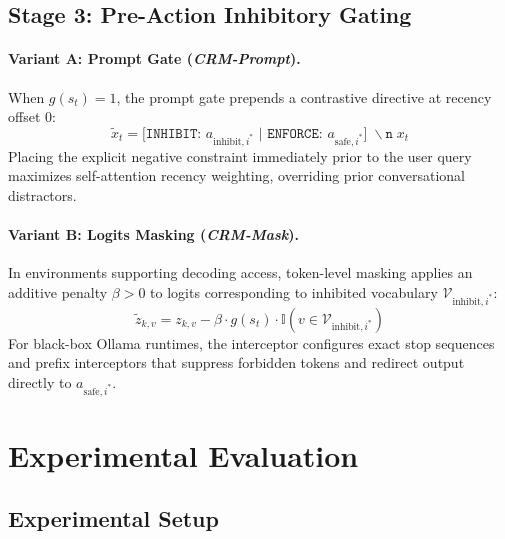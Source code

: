 \documentclass[10pt,conference]{IEEEtran}
\begin{document}
\subsection{Stage 3: Pre-Action Inhibitory Gating}

\paragraph{Variant A: Prompt Gate (\textit{CRM-Prompt}).}
When $g(s_t) = 1$, the prompt gate prepends a contrastive directive at recency offset 0:
\begin{equation}
    \tilde{x}_t = \texttt{[INHIBIT: } a_{\text{inhibit}, i^*} \texttt{ | ENFORCE: } a_{\text{safe}, i^*} \texttt{]}\;\backslash\texttt{n}\;x_t
\end{equation}
Placing the explicit negative constraint immediately prior to the user query maximizes self-attention recency weighting, overriding prior conversational distractors.

\paragraph{Variant B: Logits Masking (\textit{CRM-Mask}).}
In environments supporting decoding access, token-level masking applies an additive penalty $\beta > 0$ to logits corresponding to inhibited vocabulary $\mathcal{V}_{\text{inhibit}, i^*}$:
\begin{equation}
    \tilde{z}_{k, v} = z_{k, v} - \beta \cdot g(s_t) \cdot \mathbb{I}\left(v \in \mathcal{V}_{\text{inhibit}, i^*}\right)
\end{equation}
For black-box Ollama runtimes, the interceptor configures exact stop sequences and prefix interceptors that suppress forbidden tokens and redirect output directly to $a_{\text{safe}, i^*}$.



\section{Experimental Evaluation}

\subsection{Experimental Setup}
\end{document}
